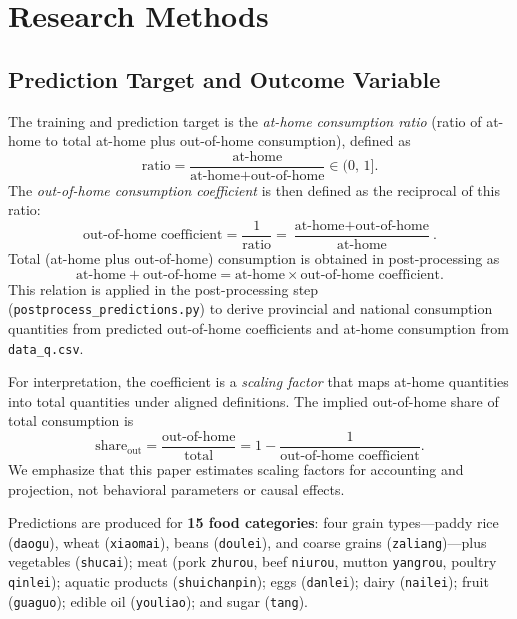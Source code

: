 
\section{Research Methods}
\label{sec:methods}

\subsection{Prediction Target and Outcome Variable}

The training and prediction target is the \emph{at-home consumption ratio} (ratio of at-home to total at-home plus out-of-home consumption), defined as
\begin{equation}
  \text{ratio} = \frac{\text{at-home}}{\text{at-home} + \text{out-of-home}} \in (0,\,1].
\end{equation}
The \emph{out-of-home consumption coefficient} is then defined as the reciprocal of this ratio:
\begin{equation}
  \text{out-of-home coefficient} = \frac{1}{\text{ratio}} = \frac{\text{at-home} + \text{out-of-home}}{\text{at-home}}.
\end{equation}
Total (at-home plus out-of-home) consumption is obtained in post-processing as
\begin{equation}
  \text{at-home} + \text{out-of-home} = \text{at-home} \times \text{out-of-home coefficient}.
\end{equation}
This relation is applied in the post-processing step (\texttt{postprocess\_predictions.py}) to derive provincial and national consumption quantities from predicted out-of-home coefficients and at-home consumption from \texttt{data\_q.csv}.

For interpretation, the coefficient is a \emph{scaling factor} that maps at-home quantities into total quantities under aligned definitions. The implied out-of-home share of total consumption is
\begin{equation}
  \text{share}_{\text{out}} = \frac{\text{out-of-home}}{\text{total}} = 1 - \frac{1}{\text{out-of-home coefficient}}.
\end{equation}
We emphasize that this paper estimates scaling factors for accounting and projection, not behavioral parameters or causal effects.

Predictions are produced for \textbf{15 food categories}: four grain types---paddy rice (\texttt{daogu}), wheat (\texttt{xiaomai}), beans (\texttt{doulei}), and coarse grains (\texttt{zaliang})---plus vegetables (\texttt{shucai}); meat (pork \texttt{zhurou}, beef \texttt{niurou}, mutton \texttt{yangrou}, poultry \texttt{qinlei}); aquatic products (\texttt{shuichanpin}); eggs (\texttt{danlei}); dairy (\texttt{nailei}); fruit (\texttt{guaguo}); edible oil (\texttt{youliao}); and sugar (\texttt{tang}).

